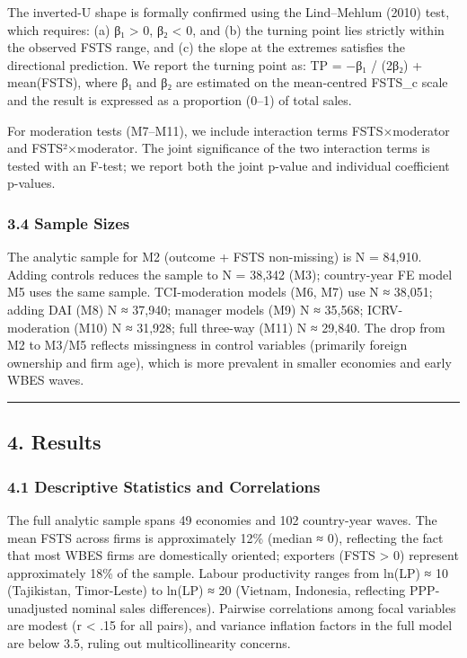 \documentclass[12pt,a4paper]{article}
\begin{document}
The inverted-U shape is formally confirmed using the Lind--Mehlum (2010)
test, which requires: (a) β₁ \textgreater{} 0, β₂ \textless{} 0, and (b)
the turning point lies strictly within the observed FSTS range, and (c)
the slope at the extremes satisfies the directional prediction. We
report the turning point as: TP = −β₁ / (2β₂) + mean(FSTS), where β₁ and
β₂ are estimated on the mean-centred FSTS\_c scale and the result is
expressed as a proportion (0--1) of total sales.

For moderation tests (M7--M11), we include interaction terms
FSTS×moderator and FSTS²×moderator. The joint significance of the two
interaction terms is tested with an F-test; we report both the joint
p-value and individual coefficient p-values.

\hypertarget{34-sample-sizes}{%
\subsubsection{3.4 Sample Sizes}\label{34-sample-sizes}}

The analytic sample for M2 (outcome + FSTS non-missing) is N = 84,910.
Adding controls reduces the sample to N = 38,342 (M3); country-year FE
model M5 uses the same sample. TCI-moderation models (M6, M7) use N ≈
38,051; adding DAI (M8) N ≈ 37,940; manager models (M9) N ≈ 35,568;
ICRV-moderation (M10) N ≈ 31,928; full three-way (M11) N ≈ 29,840. The
drop from M2 to M3/M5 reflects missingness in control variables
(primarily foreign ownership and firm age), which is more prevalent in
smaller economies and early WBES waves.

\begin{center}\rule{0.5\linewidth}{0.5pt}\end{center}

\hypertarget{4-results}{%
\subsection{4. Results}\label{4-results}}

\hypertarget{41-descriptive-statistics-and-correlations}{%
\subsubsection{4.1 Descriptive Statistics and
Correlations}\label{41-descriptive-statistics-and-correlations}}

The full analytic sample spans 49 economies and 102 country-year waves.
The mean FSTS across firms is approximately 12\% (median ≈ 0),
reflecting the fact that most WBES firms are domestically oriented;
exporters (FSTS \textgreater{} 0) represent approximately 18\% of the
sample. Labour productivity ranges from ln(LP) ≈ 10 (Tajikistan,
Timor-Leste) to ln(LP) ≈ 20 (Vietnam, Indonesia, reflecting
PPP-unadjusted nominal sales differences). Pairwise correlations among
focal variables are modest (\textbar r\textbar{} \textless{} .15 for all
pairs), and variance inflation factors in the full model are below 3.5,
ruling out multicollinearity concerns.
\end{document}
